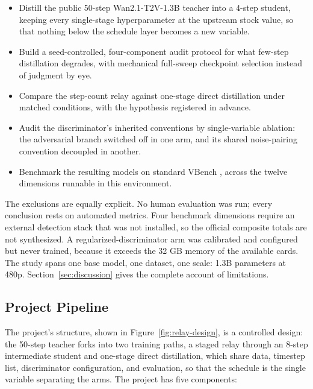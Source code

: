 \documentclass[11pt,a4paper]{article}
\begin{document}
\begin{itemize}
  \item Distill the public 50-step Wan2.1-T2V-1.3B teacher into a 4-step student, keeping every single-stage hyperparameter at the upstream stock value, so that nothing below the schedule layer becomes a new variable.
  \item Build a seed-controlled, four-component audit protocol for what few-step distillation degrades, with mechanical full-sweep checkpoint selection instead of judgment by eye.
  \item Compare the step-count relay against one-stage direct distillation under matched conditions, with the hypothesis registered in advance.
  \item Audit the discriminator's inherited conventions by single-variable ablation: the adversarial branch switched off in one arm, and its shared noise-pairing convention decoupled in another.
  \item Benchmark the resulting models on standard VBench \cite{vbench}, across the twelve dimensions runnable in this environment.
\end{itemize}

The exclusions are equally explicit. No human evaluation was run; every conclusion rests on automated metrics. Four benchmark dimensions require an external detection stack that was not installed, so the official composite totals are not synthesized. A regularized-discriminator arm was calibrated and configured but never trained, because it exceeds the 32 GB memory of the available cards. The study spans one base model, one dataset, one scale: 1.3B parameters at 480p. Section~\ref{sec:discussion} gives the complete account of limitations.

\subsection{Project Pipeline}\label{sec:overview-pipeline}

The project's structure, shown in Figure~\ref{fig:relay-design}, is a controlled design: the 50-step teacher forks into two training paths, a staged relay through an 8-step intermediate student and one-stage direct distillation, which share data, timestep list, discriminator configuration, and evaluation, so that the schedule is the single variable separating the arms. The project has five components:
\end{document}
